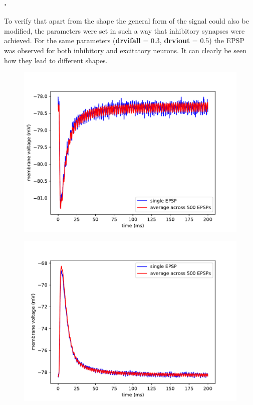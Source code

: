 \documentclass[10pt,a4paper]{article}
\begin{document}
\subsubsection{.}
To verify that apart from the shape the general form of the signal could
also be modified,  the parameters were set in such a way that inhibitory
synapses were achieved.  For the same parameters (\textbf{drvifall} = 0.3,
\textbf{drviout} = 0.5) the EPSP was observed for both inhibitory and
excitatory neurons.  It can clearly be seen how they lead to different shapes.
\begin{figure}
    				\centering
    				\includegraphics[width=\linewidth]{figures/epsp_inh_fall_03_out_05.pdf}
    				\label{inh_syn}
\end{figure}
  \begin{figure}
    				\centering
    				\includegraphics[width=\linewidth]{figures/epsp_exc_fall_03_out_05.pdf}
    				\label{exc_syn}
\end{figure}
\end{document}
